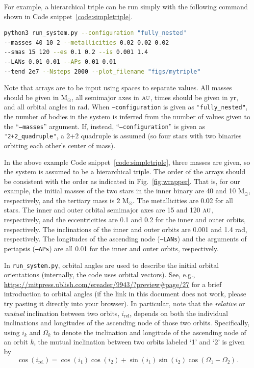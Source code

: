 \documentclass[a4paper,11pt]{article}
\newcommand{\F}{Fig.}
\newcommand{\code}{Code snippet}
\newcommand{\msun}{\mathrm{M}_\odot}
\newcommand{\au}{\textsc{au}}
\begin{document}
For example, a hierarchical triple can be run simply with the following command shown in \code~\ref{code:simpletriple}. 
\begin{lstlisting}[caption={Example usage of \texttt{run\_system.py} for a triple.},label={code:simpletriple},language=bash]
python3 run_system.py --configuration "fully_nested"
--masses 40 10 2 --metallicities 0.02 0.02 0.02 
--smas 15 120 --es 0.1 0.2 --is 0.001 1.4 
--LANs 0.01 0.01 --APs 0.01 0.01
--tend 2e7 --Nsteps 2000 --plot_filename "figs/mytriple"
\end{lstlisting}
Note that arrays are to be input using spaces to separate values. All masses should be given in $\msun$, all semimajor axes in $\au$, times should be given in yr, and all orbital angles in rad. When \texttt{--configuration} is given as \texttt{"fully\_nested"}, the number of bodies in the system is inferred from the number of values given to the ``\texttt{--masses}'' argument. If, instead, ``\texttt{--configuration}'' is given as \texttt{"2+2\_quadruple"}, a 2+2 quadruple is assumed (so four stars with two binaries orbiting each other's center of mass). 

In the above example \code~\ref{code:simpletriple}, three masses are given, so the system is assumed to be a hierarchical triple. The order of the arrays should be consistent with the order as indicated in \F~\ref{fig:wrapper}. That is, for our example, the initial masses of the two stars in the inner binary are 40 and 10 $\msun$, respectively, and the tertiary mass is 2 $\msun$. The metallicities are 0.02 for all stars. The inner and outer orbital semimajor axes are 15 and 120 $\au$, respectively, and the eccentricities are 0.1 and 0.2 for the inner and outer orbits, respectively. The inclinations of the inner and outer orbits are 0.001 and 1.4 rad, respectively. The longitudes of the ascending node (\texttt{--LANs}) and the arguments of periapsis (\texttt{--APs}) are all 0.01 for the inner and outer orbits, respectively. 

\begin{leftbar}
In \texttt{run\_system.py}, orbital angles are used to describe the initial orbital orientations (internally, the code uses orbital vectors). See, e.g., \href{https://mitpress.ublish.com/ereader/9943/?preview#page/27}{https://mitpress.ublish.com/ereader/9943/?preview\#page/27} for a brief introduction to orbital angles (if the link in this document does not work, please try pasting it directly into your browser). In particular, note that the {\it relative} or {\it mutual} inclination between two orbits, $i_\mathrm{rel}$, depends on both the individual inclinations and longitudes of the ascending node of those two orbits. Specifically, using $i_k$ and $\Omega_k$ to denote the inclination and longitude of the ascending node of an orbit $k$, the mutual inclination between two orbits labeled `1' and `2' is given by
\begin{equation}
\cos (i_\mathrm{rel}) = \cos (i_1) \cos (i_2) + \sin(i_1) \sin(i_2) \cos(\Omega_1 - \Omega_2).
\end{equation}
\end{leftbar}
\end{document}
